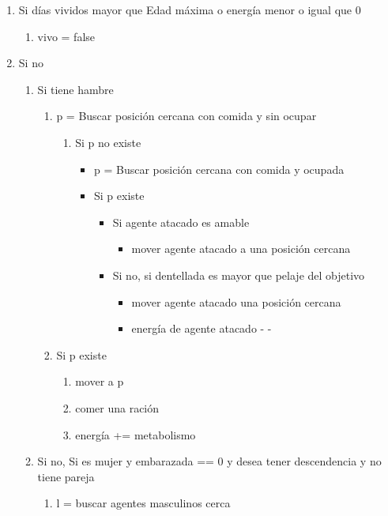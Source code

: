 \begin{enumerate}
 \item Si días vividos mayor que Edad máxima o energía menor o igual que 0
 \begin{enumerate}
  \item vivo = false
 \end{enumerate}
 \item Si no
 \begin{enumerate}
  \item Si tiene hambre
  \begin{enumerate}
   \item p = Buscar posición cercana con comida y sin ocupar
   \begin{enumerate}
    \item Si p no existe
    \begin{itemize}
     \item p = Buscar posición cercana con comida y ocupada
     \item Si p existe
     \begin{itemize}
      \item Si agente atacado es amable
      \begin{itemize}
       \item mover agente atacado a una posición cercana
      \end{itemize}
      \item Si no, si dentellada es mayor que pelaje del objetivo
      \begin{itemize}
       \item mover agente atacado una posición cercana
       \item energía de agente atacado - -
      \end{itemize}
     \end{itemize}
    \end{itemize}
   \end{enumerate}
   \item Si p existe
   \begin{enumerate}
    \item mover a p
    \item comer una ración
    \item energía += metabolismo
   \end{enumerate}
  \end{enumerate}
  \item Si no,  Si es mujer y embarazada == 0 y desea tener descendencia y no
tiene pareja
  \begin{enumerate}
   \item l = buscar agentes masculinos cerca

\end{enumerate}
\end{enumerate}
\end{enumerate}
